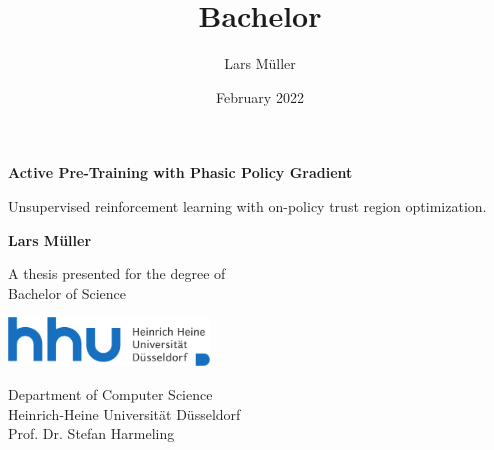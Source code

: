 \documentclass{article}
\title{Bachelor}
\author{Lars Müller}
\date{February 2022}
\begin{document}
\begin{titlepage}
    \begin{center}
        \vspace*{1cm}
            
        \Huge
        \textbf{Active Pre-Training with Phasic Policy Gradient}
            
        \vspace{0.5cm}
        \LARGE
        Unsupervised reinforcement learning with on-policy trust region
        optimization.
            
        \vspace{1.5cm}
            
        \textbf{Lars Müller}
            
        \vfill
            
        A thesis presented for the degree of\\
        Bachelor of Science
            
        \vspace{0.8cm}
            
        \includegraphics[width=0.4\textwidth]{HHU_Logo.pdf}
            
        \Large
        Department of Computer Science\\
        Heinrich-Heine Universität Düsseldorf\\
        Prof. Dr. Stefan Harmeling
            
    \end{center}
\end{titlepage}
\newpage
\clearpage


\end{document}
